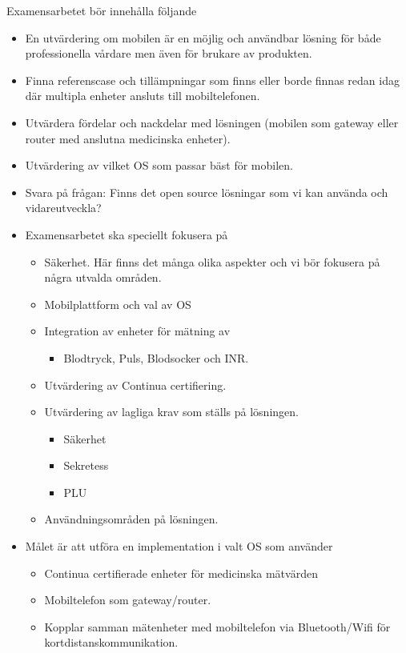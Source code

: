\documentclass[a4paper]{article}
\begin{document}
Examensarbetet bör innehålla följande
\begin{itemize}
	\item En utvärdering om mobilen är en möjlig och användbar lösning för både professionella vårdare men även för brukare av produkten.
	\item Finna referenscase och tillämpningar som finns eller borde finnas redan idag där multipla enheter ansluts till mobiltelefonen.
	\item Utvärdera fördelar och nackdelar med lösningen (mobilen som gateway eller router med anslutna medicinska enheter).
	\item Utvärdering av vilket OS som passar bäst för mobilen.
	\item Svara på frågan: Finns det open source lösningar som vi kan använda och vidareutveckla?\\
	\item Examensarbetet ska speciellt fokusera på
	\begin{itemize}
		\item Säkerhet. Här finns det många olika aspekter och vi bör fokusera på några utvalda områden.
		\item Mobilplattform och val av OS
		\item Integration av enheter för mätning av
		\begin{itemize}
			\item Blodtryck, Puls, Blodsocker och INR.
		\end{itemize}
		\item Utvärdering av Continua certifiering.
		\item Utvärdering av lagliga krav som ställs på lösningen.
		\begin{itemize}
			\item Säkerhet
			\item Sekretess
			\item PLU
		\end{itemize}
		\item Användningsområden på lösningen.
	\end{itemize}
	\item Målet är att utföra en implementation i valt OS som använder
	\begin{itemize}
		\item Continua certifierade enheter för medicinska mätvärden
		\item Mobiltelefon som gateway/router.
		\item Kopplar samman mätenheter med mobiltelefon via Bluetooth/Wifi för kortdistanskommunikation.

\end{itemize}
\end{itemize}
\end{document}
